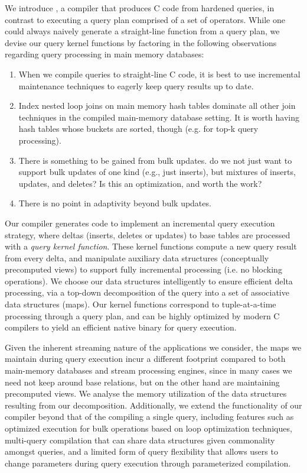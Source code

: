 We introduce \compiler, a compiler that produces C code from hardened queries, in
contrast to executing a query plan comprised of a set of operators. 
While one could always naively generate a straight-line function from a query
plan, we devise our query kernel functions by factoring in the following
observations regarding query processing in main memory databases:

\begin{enumerate}
\item
When we compile queries to straight-line C code, it is best to use incremental
maintenance techniques to eagerly keep query results up to date.

\item
Index nested loop joins on main memory hash tables
dominate all other join techniques in the compiled
main-memory database setting.
It is worth having hash tables whose buckets are sorted, though (e.g. for
top-k query processing).

\item
There is something to be gained from bulk updates.
do we not just want to support bulk updates of one kind (e.g., just inserts),
but mixtures of inserts, updates, and deletes? Is this an optimization, and
worth the work?

\item
There is no point in adaptivity beyond bulk updates.
\end{enumerate}

Our compiler generates code to implement an incremental query execution strategy,
where deltas (inserts, deletes or updates) to base tables are processed with a
\textit{query kernel function}. These kernel functions compute a new query result
from every delta, and manipulate auxiliary data structures (conceptually
precomputed views) to support fully incremental processing (i.e. no blocking
operations). We choose our data structures intelligently to ensure efficient
delta processing, via a top-down decomposition of the query into a set of
associative data structures (maps). Our kernel functions correspond to
tuple-at-a-time processing through a query plan, and can be highly optimized by
modern C compilers to yield an efficient native binary for query execution.

Given the inherent streaming nature of the applications we consider, the maps we
maintain during query execution incur a different footprint compared to both
main-memory databases and stream processing engines, since in many cases we need
not keep around base relations, but on the other hand are maintaining precomputed
views. We analyse the memory utilization of the data structures resulting from
our decomposition. Additionally, we extend the functionality of our compiler
beyond that of the compiling a single query, including features such as optimized
execution for bulk operations based on loop optimization techniques, multi-query
compilation that can share data structures given commonality amongst queries, and
a limited form of query flexibility that allows users to change parameters during
query execution through parameterized compilation.

